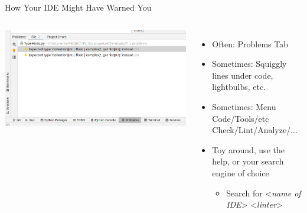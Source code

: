 
\begin{frame}{How Your IDE Might Have Warned You}
%
\begin{columns}[T]
	\includegraphics[width=\linewidth]{./gfx/07-pycharm-linter}
%
	\begin{itemize}
	\item Often: Problems Tab
	\item Sometimes: Squiggly lines under code, lightbulbs, etc.
	\item Sometimes: Menu \thus Code/Tools/etc \thus Check/Lint/Analyze/...
	\item Toy around, use the help, or your search engine of choice
		\begin{itemize}
		\item Search for <\emph{name of IDE}> <\emph{linter}>
		\end{itemize}
	\end{itemize}
\end{columns}
%
\end{frame}


